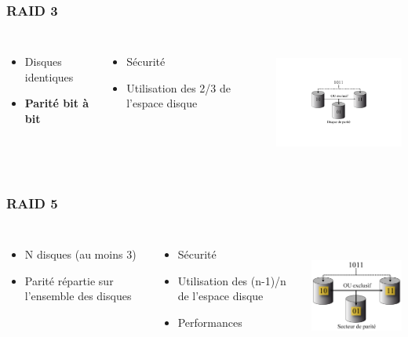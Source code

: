 \begin{frame}
\frametitle{RAID 3}
\begin{columns}
\begin{itemize}
\item Disques identiques
\item \textbf{Parité bit à bit}
\end{itemize}
\begin{itemize}
\item Sécurité
\item Utilisation des 2/3 de l’espace disque
\end{itemize}
\includegraphics[height=4cm]{../illustration/RAID3.pdf}
\end{columns}
\end{frame}


\begin{frame}
\frametitle{RAID 5}
\begin{columns}
\begin{itemize}
\item N disques (au moins 3)
\item Parité répartie sur l’ensemble des disques
\end{itemize}
\begin{itemize}
\item Sécurité
\item Utilisation des (n-1)/n de l’espace disque
\item Performances
\end{itemize}
\includegraphics[height=4cm]{../illustration/RAID5.png}
\end{columns}
\end{frame}


